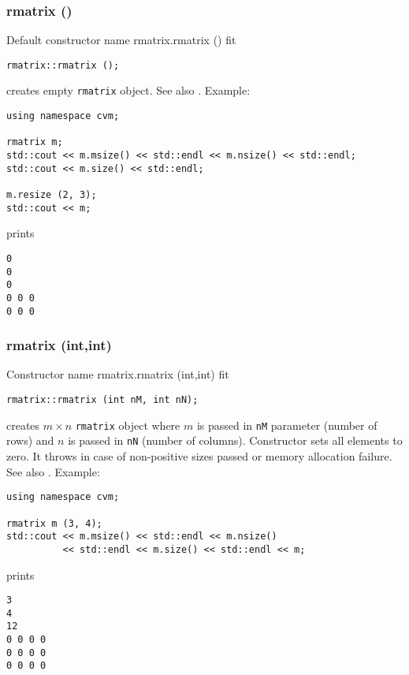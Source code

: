 \subsubsection{rmatrix ()}
Default constructor%
\pdfdest name {rmatrix.rmatrix ()} fit
\begin{verbatim}
rmatrix::rmatrix ();
\end{verbatim}
creates  empty \verb"rmatrix" object.
See also .
Example:
\begin{Verbatim}
using namespace cvm;

rmatrix m;
std::cout << m.msize() << std::endl << m.nsize() << std::endl;
std::cout << m.size() << std::endl;

m.resize (2, 3);
std::cout << m;
\end{Verbatim}
prints
\begin{Verbatim}
0
0
0
0 0 0
0 0 0
\end{Verbatim}
\newpage



\subsubsection{rmatrix (int,int)}
Constructor%
\pdfdest name {rmatrix.rmatrix (int,int)} fit
\begin{verbatim}
rmatrix::rmatrix (int nM, int nN);
\end{verbatim}
creates  $m\times n$ \verb"rmatrix" object where $m$ is passed in
\verb"nM" parameter (number of rows) and $n$ is passed in
\verb"nN" (number of columns). Constructor sets all elements to zero.
It throws  
in case of non-positive sizes passed or memory allocation failure.
See also .
Example:
\begin{Verbatim}
using namespace cvm;

rmatrix m (3, 4);
std::cout << m.msize() << std::endl << m.nsize()
          << std::endl << m.size() << std::endl << m;
\end{Verbatim}
prints
\begin{Verbatim}
3
4
12
0 0 0 0
0 0 0 0
0 0 0 0
\end{Verbatim}
\newpage




